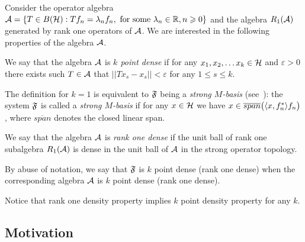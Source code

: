 \documentclass[12pt]{amsart}
\theoremstyle{case}
\begin{document}
    Consider the operator algebra $\cal{A} = \{T\in B(\cal{H}): Tf_n = \lambda_n f_n, \text{ for some } \lambda_n \in \mathbb{R}, n \geq 0\}$
      and the algebra $R_1(\cal{A})$ generated by rank one operators of $\cal{A}$.
    We are interested in the following properties of the algebra $\cal{A}$.
    \begin{definition}
      \label{kpd}
      We say that the algebra $\cal{A}$ is \emph{$k$ point dense} if for any $x_1, x_2,\dots x_k \in \cal{H}$ and $\varepsilon > 0$
        there exists such $T\in \cal{A}$ that $||Tx_s - x_s|| < \varepsilon$ for any $1 \leq s \leq k$.
    \end{definition}
    The definition for $k=1$ is equivalent to $\fsys$ being a \emph{strong $M$-basis} (see~\cite{katavolos}):
      the system $\fsys$ is called a \emph{strong $M$-basis} if for any $x\in\cal{H}$ we have $x \in \overline{span}\big(\inner{x}{f^*_n}f_n\big)$, where
      $\overline{span}$ denotes the closed linear span.
    \begin{definition}
      \label{r1d}
      We say that the algebra $\cal{A}$ is \emph{rank one dense} if the unit ball of rank one subalgebra $R_1(\cal{A})$
        is dense in the unit ball of $\cal{A}$ in the strong operator topology.
    \end{definition}
    By abuse of notation, we say that $\fsys$ is $k$ point dense (rank one dense)
      when the corresponding algebra $\cal{A}$ is $k$ point dense (rank one dense).

    Notice that rank one density property implies $k$ point density property for any $k$.

  \subsection{Motivation}
\end{document}
